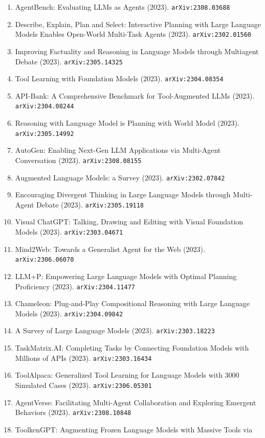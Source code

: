 \documentclass[11pt]{article}
\begin{document}
\begin{enumerate}
  \item AgentBench: Evaluating LLMs as Agents (2023). \texttt{arXiv:2308.03688}
  \item Describe, Explain, Plan and Select: Interactive Planning with Large
  Language Models Enables Open-World Multi-Task Agents (2023). \texttt{arXiv:2302.01560}
  \item Improving Factuality and Reasoning in Language Models through Multiagent
  Debate (2023). \texttt{arXiv:2305.14325}
  \item Tool Learning with Foundation Models (2023). \texttt{arXiv:2304.08354}
  \item API-Bank: A Comprehensive Benchmark for Tool-Augmented LLMs (2023). \texttt{arXiv:2304.08244}
  \item Reasoning with Language Model is Planning with World Model (2023). \texttt{arXiv:2305.14992}
  \item AutoGen: Enabling Next-Gen LLM Applications via Multi-Agent Conversation (2023). \texttt{arXiv:2308.08155}
  \item Augmented Language Models: a Survey (2023). \texttt{arXiv:2302.07842}
  \item Encouraging Divergent Thinking in Large Language Models through
  Multi-Agent Debate (2023). \texttt{arXiv:2305.19118}
  \item Visual ChatGPT: Talking, Drawing and Editing with Visual Foundation
  Models (2023). \texttt{arXiv:2303.04671}
  \item Mind2Web: Towards a Generalist Agent for the Web (2023). \texttt{arXiv:2306.06070}
  \item LLM+P: Empowering Large Language Models with Optimal Planning
  Proficiency (2023). \texttt{arXiv:2304.11477}
  \item Chameleon: Plug-and-Play Compositional Reasoning with Large Language
  Models (2023). \texttt{arXiv:2304.09842}
  \item A Survey of Large Language Models (2023). \texttt{arXiv:2303.18223}
  \item TaskMatrix.AI: Completing Tasks by Connecting Foundation Models with
  Millions of APIs (2023). \texttt{arXiv:2303.16434}
  \item ToolAlpaca: Generalized Tool Learning for Language Models with 3000
  Simulated Cases (2023). \texttt{arXiv:2306.05301}
  \item AgentVerse: Facilitating Multi-Agent Collaboration and Exploring
  Emergent Behaviors (2023). \texttt{arXiv:2308.10848}
  \item ToolkenGPT: Augmenting Frozen Language Models with Massive Tools via

\end{enumerate}
\end{document}
